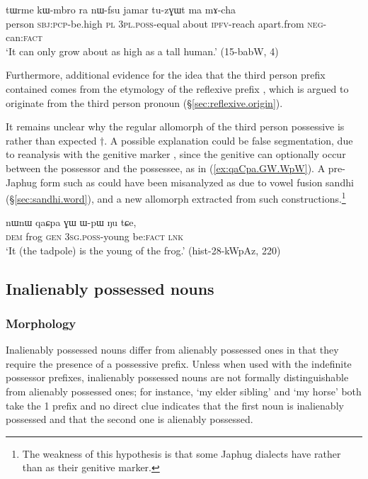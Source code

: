 \begin{exe}
\ex \label{ex:nWfsu}
\gll tɯrme kɯ-mbro ra nɯ-fsu jamar tu-zɣɯt ma mɤ-cha \\
person \textsc{sbj}:\textsc{pcp}-be.high \textsc{pl}  \textsc{3pl}.\textsc{poss}-equal about \textsc{ipfv}-reach apart.from \textsc{neg}-can:\textsc{fact} \\
\glt `It can only grow about as high as a tall human.' (15-babW, 4)
\end{exe}

Furthermore, additional evidence for the idea that the third person prefix contained  comes from the etymology of the reflexive prefix , which is argued to originate from the third person pronoun (§\ref{sec:reflexive.origin}).

It remains unclear why the regular allomorph of the third person possessive is  rather than expected $\dagger$. A possible explanation could be false segmentation, due to reanalysis with the genitive marker , since the genitive can optionally occur between the possessor and the possessee, as in (\ref{ex:qaCpa.GW.WpW}). A pre-Japhug form such as  could have been misanalyzed as  due to vowel fusion sandhi (§\ref{sec:sandhi.word}), and a new allomorph  extracted from such constructions.\footnote{The weakness of this hypothesis is that some Japhug dialects have  rather than  as their genitive marker.}

\begin{exe}
\ex \label{ex:qaCpa.GW.WpW}
 \gll nɯnɯ qaɕpa ɣɯ ɯ-pɯ ŋu tɕe, \\
 \textsc{dem} frog \textsc{gen} \textsc{3sg}.\textsc{poss}-young be:\textsc{fact} \textsc{lnk} \\
 \glt `It (the tadpole) is the young of the frog.' (hist-28-kWpAz, 220)
\end{exe} 


\subsection{Inalienably possessed nouns} \label{sec:inalienably.possessed}

\subsubsection{Morphology} \label{sec:inalienably.possessed.morpho}
Inalienably possessed nouns differ from alienably possessed ones in that they require the presence of a possessive prefix.  Unless when used with the indefinite possessor prefixes, inalienably possessed nouns are not formally distinguishable from alienably possessed ones; for instance,  `my elder sibling' and  `my horse' both take the 1\sg{}  prefix and no direct clue indicates that the first noun is inalienably possessed and that the second one is alienably possessed.

